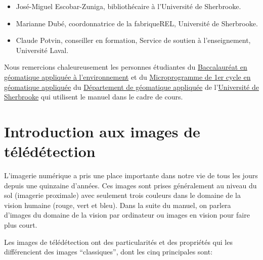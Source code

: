 \documentclass[
  11pt,
  letterpaper,
  open=any,
  twoside=false,
  french]{scrbook}
\begin{document}
\begin{itemize}
\item
  José-Miguel Escobar-Zuniga, bibliothécaire à l'Université de
  Sherbrooke.
\item
  Marianne Dubé, coordonnatrice de la fabriqueREL, Université de
  Sherbrooke.
\item
  Claude Potvin, conseiller en formation, Service de soutien à
  l'enseignement, Université Laval.
\end{itemize}

Nous remercions chaleureusement les personnes étudiantes du
\href{https://www.usherbrooke.ca/admission/programme/271/baccalaureat-en-geomatiqueappliquee-a-lenvironnement/}{Baccalauréat
en géomatique appliquée à l'environnement} et du
\href{https://www.usherbrooke.ca/admission/programme/429/microprogramme-de-1er-cycleen-geomatique-appliquee/}{Microprogramme
de 1er cycle en géomatique appliquée} du
\href{https://www.usherbrooke.ca/geomatique/}{Département de géomatique
appliquée} de l'\href{https://www.usherbrooke.ca/}{Université de
Sherbrooke} qui utilisent le manuel dans le cadre de cours.

\section*{Introduction aux images de télédétection}\label{sect006}


L'imagerie numérique a pris une place importante dans notre vie de tous
les jours depuis une quinzaine d'années. Ces images sont prises
généralement au niveau du sol (imagerie proximale) avec seulement trois
couleurs dans le domaine de la vision humaine (rouge, vert et bleu).
Dans la suite du manuel, on parlera d'images du domaine de la vision par
ordinateur ou images en vision pour faire plus court.

Les images de télédétection ont des particularités et des propriétés qui
les différencient des images ``classiques'', dont les cinq principales
sont:
\end{document}

